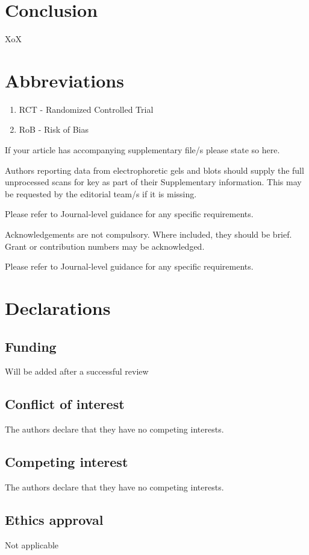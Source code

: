 \documentclass[sn-mathphys,Numbered]{sn-jnl}%
\theoremstyle{thmstyleone}%
\theoremstyle{thmstyletwo}%
\theoremstyle{thmstylethree}%
\begin{document}
\section{Conclusion}
\label{sec:conclusion}
%
XoX
%
%
%
\section{Abbreviations}%
%
\begin{enumerate}
    \item RCT - Randomized Controlled Trial
    \item RoB - Risk of Bias
\end{enumerate}
%
%
%
\backmatter


If your article has accompanying supplementary file/s please state so here. 

Authors reporting data from electrophoretic gels and blots should supply the full unprocessed scans for key as part of their Supplementary information. This may be requested by the editorial team/s if it is missing.

Please refer to Journal-level guidance for any specific requirements.


Acknowledgements are not compulsory. Where included, they should be brief. Grant or contribution numbers may be acknowledged.

Please refer to Journal-level guidance for any specific requirements.
%
%
%
\section*{Declarations}
%
\subsection*{Funding}
%
Will be added after a successful review
%
%
%
\subsection*{Conflict of interest}
%
The authors declare that they have no competing interests.
%
%
%
\subsection*{Competing interest}
%
The authors declare that they have no competing interests.
%
%
%
\subsection*{Ethics approval}
%
Not applicable
%
%
%
\end{document}
